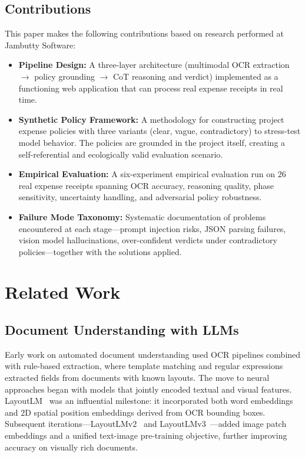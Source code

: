 \documentclass[11pt,a4paper]{article}
\begin{document}
\subsection{Contributions}
This paper makes the following contributions based on research performed at Jambutty Software:
\begin{itemize}
    \item \textbf{Pipeline Design:} A three-layer architecture (multimodal OCR extraction $\rightarrow$ policy grounding $\rightarrow$ CoT reasoning and verdict) implemented as a functioning web application that can process real expense receipts in real time.
    \item \textbf{Synthetic Policy Framework:} A methodology for constructing project expense policies with three variants (clear, vague, contradictory) to stress-test model behavior. The policies are grounded in the project itself, creating a self-referential and ecologically valid evaluation scenario.
    \item \textbf{Empirical Evaluation:} A six-experiment empirical evaluation run on 26 real expense receipts spanning OCR accuracy, reasoning quality, phase sensitivity, uncertainty handling, and adversarial policy robustness.
    \item \textbf{Failure Mode Taxonomy:} Systematic documentation of problems encountered at each stage---prompt injection risks, JSON parsing failures, vision model hallucinations, over-confident verdicts under contradictory policies---together with the solutions applied.
\end{itemize}

\section{Related Work}

\subsection{Document Understanding with LLMs}
Early work on automated document understanding used OCR pipelines combined with rule-based extraction, where template matching and regular expressions extracted fields from documents with known layouts. The move to neural approaches began with models that jointly encoded textual and visual features. LayoutLM~\cite{xu2020layoutlm} was an influential milestone: it incorporated both word embeddings and 2D spatial position embeddings derived from OCR bounding boxes. Subsequent iterations---LayoutLMv2~\cite{xu2021layoutlmv2} and LayoutLMv3~\cite{huang2022layoutlmv3}---added image patch embeddings and a unified text-image pre-training objective, further improving accuracy on visually rich documents.
\end{document}
